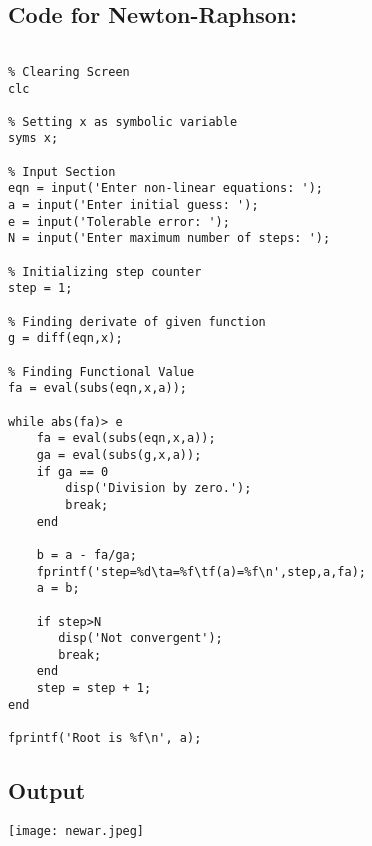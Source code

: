 \subsection*{Code for Newton-Raphson:}
\begin{verbatim}
    
% Clearing Screen
clc

% Setting x as symbolic variable
syms x;

% Input Section
eqn = input('Enter non-linear equations: ');
a = input('Enter initial guess: ');
e = input('Tolerable error: ');
N = input('Enter maximum number of steps: ');

% Initializing step counter
step = 1;

% Finding derivate of given function
g = diff(eqn,x);

% Finding Functional Value
fa = eval(subs(eqn,x,a));

while abs(fa)> e
    fa = eval(subs(eqn,x,a));
    ga = eval(subs(g,x,a));
    if ga == 0
        disp('Division by zero.');
        break;
    end
    
    b = a - fa/ga;
    fprintf('step=%d\ta=%f\tf(a)=%f\n',step,a,fa);
    a = b;
    
    if step>N
       disp('Not convergent'); 
       break;
    end
    step = step + 1;
end

fprintf('Root is %f\n', a);
\end{verbatim}



\vspace{20mm}
\subsection*{Output}
\begin{center}
    \centering
    \texttt{[image: newar.jpeg]}
\end{center}

